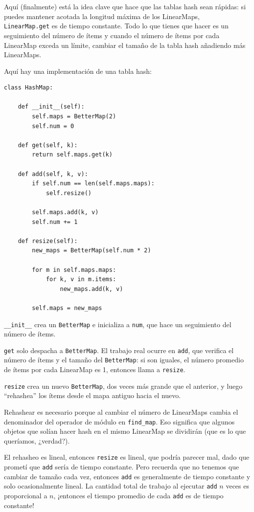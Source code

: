 \documentclass[10pt]{book}
\begin{document}
Aquí (finalmente) está la idea clave que hace que las tablas hash sean rápidas: si
puedes mantener acotada la longitud máxima de los LinearMaps, {\tt
  LinearMap.get} es de tiempo constante.  Todo lo que tienes que hacer es un seguimiento
del número de ítems y cuando el número de
ítems por cada LinearMap exceda un límite, cambiar el tamaño de la tabla hash
añadiendo más LinearMaps.

Aquí hay una implementación de una tabla hash:

\begin{verbatim}
class HashMap:

    def __init__(self):
        self.maps = BetterMap(2)
        self.num = 0

    def get(self, k):
        return self.maps.get(k)

    def add(self, k, v):
        if self.num == len(self.maps.maps):
            self.resize()

        self.maps.add(k, v)
        self.num += 1

    def resize(self):
        new_maps = BetterMap(self.num * 2)

        for m in self.maps.maps:
            for k, v in m.items:
                new_maps.add(k, v)

        self.maps = new_maps
\end{verbatim}

\verb"__init__" crea un {\tt BetterMap} e inicializa a {\tt num}, que hace un seguimiento del número de ítems.

{\tt get} solo despacha a {\tt BetterMap}.  El trabajo real ocurre
en {\tt add}, que verifica el número de ítems y el tamaño del
{\tt BetterMap}: si son iguales, el número promedio de ítems por cada
LinearMap es 1, entonces llama a {\tt resize}.

{\tt resize} crea un nuevo {\tt BetterMap}, dos veces más grande que el
anterior, y luego ``rehashea'' los ítems desde el mapa antiguo hacia el nuevo.

Rehashear es necesario porque al cambiar el número de LinearMaps
cambia el denominador del operador de módulo en
\verb"find_map".  Eso significa que algunos objetos que solían
hacer hash en el mismo LinearMap se dividirán (que es
lo que queríamos, ¿verdad?).

El rehasheo es lineal, entonces
{\tt resize} es lineal, que podría parecer mal, dado que prometí
que {\tt add} sería de tiempo constante.  Pero recuerda que
no tenemos que cambiar de tamaño cada vez, entonces {\tt add} es generalmente
de tiempo constante y solo ocasionalmente lineal.  La cantidad total
de trabajo al ejecutar {\tt add} $n$ veces es proporcional a $n$,
¡entonces el tiempo promedio de cada {\tt add} es de tiempo constante!
\end{document}
